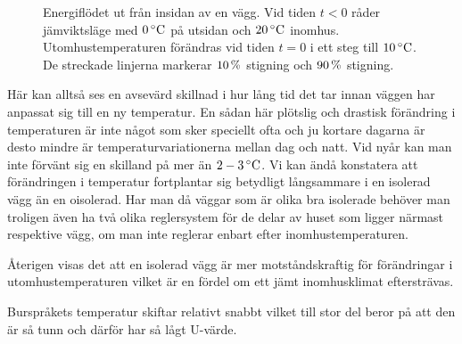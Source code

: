 \begin{figure}[hpbt]
\centering
{}\vspace{5mm}

\caption{\label{fig:energyflow_trans} Energiflödet ut från insidan av en vägg. Vid tiden $t<0$ råder jämviktsläge med $\unit[0]{^\circ C}$ på utsidan och $\unit[20]{^\circ C}$ inomhus. Utomhustemperaturen förändras vid tiden $t=0$ i ett steg till $\unit[10]{^\circ C}$. De streckade linjerna markerar $\unit[10]{\%}$ stigning och $\unit[90]{\%}$ stigning.}

\end{figure}

Här kan alltså ses en avsevärd skillnad i hur lång tid det tar innan väggen har anpassat sig till en ny temperatur. En sådan här plötslig och drastisk förändring i temperaturen är inte något som sker speciellt ofta och ju kortare dagarna är desto mindre är temperaturvariationerna mellan dag och natt. \cite{SMHItempskillnad}
Vid nyår kan man inte förvänt sig en skilland på mer än $\unit[2-3]{^\circ C}$. Vi kan ändå konstatera att förändringen i temperatur fortplantar sig betydligt långsammare i en isolerad vägg än en oisolerad. Har man då väggar som är olika bra isolerade behöver man troligen även ha två olika reglersystem för de delar av huset som ligger närmast respektive vägg, om man inte reglerar enbart efter inomhustemperaturen. 

Återigen visas det att en isolerad vägg är mer motståndskraftig för förändringar i utomhustemperaturen vilket är en fördel om ett jämt inomhusklimat eftersträvas.

Burspråkets temperatur skiftar relativt snabbt vilket till stor del beror på att den är så tunn och därför har så lågt U-värde.

